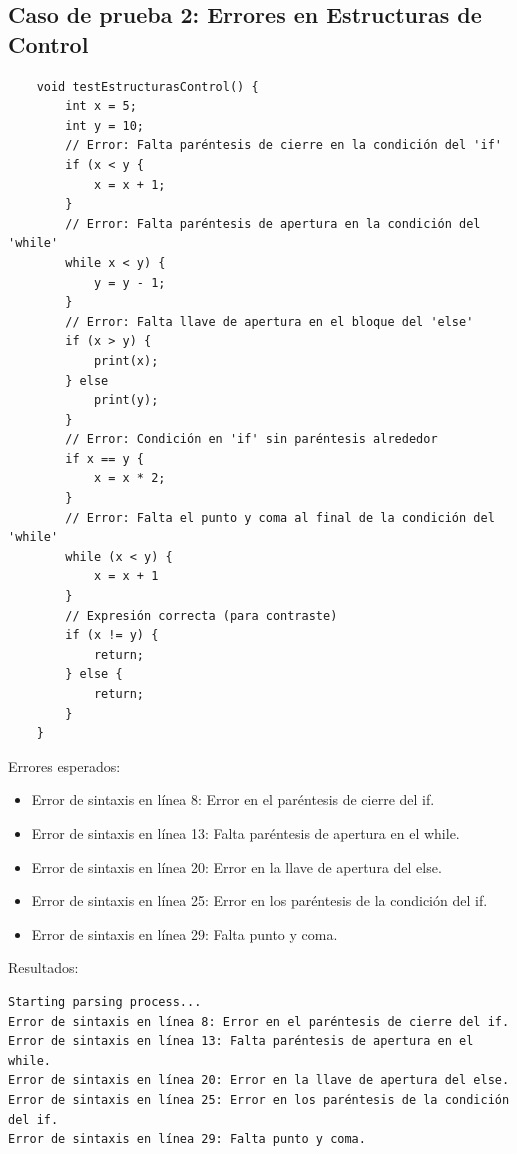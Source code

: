 \documentclass[a4paper,12pt]{article}
\begin{document}
\newpage

\subsection*{Caso de prueba 2: Errores en Estructuras de Control}
\begin{flushleft}
    \begin{verbatim}
    void testEstructurasControl() {
    	int x = 5;
    	int y = 10;
    	// Error: Falta paréntesis de cierre en la condición del 'if'
    	if (x < y {
    		x = x + 1;
    	}
    	// Error: Falta paréntesis de apertura en la condición del 'while'
    	while x < y) {
    		y = y - 1;
    	}
    	// Error: Falta llave de apertura en el bloque del 'else'
    	if (x > y) {
    		print(x);
    	} else 
    		print(y);
    	}
    	// Error: Condición en 'if' sin paréntesis alrededor
    	if x == y {
    		x = x * 2;
    	}
    	// Error: Falta el punto y coma al final de la condición del 'while'
    	while (x < y) {
    		x = x + 1
    	}
    	// Expresión correcta (para contraste)
    	if (x != y) {
    		return;
    	} else {
    		return;
    	}
    }
    \end{verbatim}
Errores esperados:
\begin{itemize}
	\item Error de sintaxis en línea 8: Error en el paréntesis de cierre del if.
	\item Error de sintaxis en línea 13: Falta paréntesis de apertura en el while.
	\item Error de sintaxis en línea 20: Error en la llave de apertura del else.
	\item Error de sintaxis en línea 25: Error en los paréntesis de la condición del if.
	\item Error de sintaxis en línea 29: Falta punto y coma.
\end{itemize}
Resultados:
\begin{verbatim}
Starting parsing process...
Error de sintaxis en línea 8: Error en el paréntesis de cierre del if.
Error de sintaxis en línea 13: Falta paréntesis de apertura en el while.
Error de sintaxis en línea 20: Error en la llave de apertura del else.
Error de sintaxis en línea 25: Error en los paréntesis de la condición del if.
Error de sintaxis en línea 29: Falta punto y coma.

\end{verbatim}
\end{flushleft}
\end{document}
